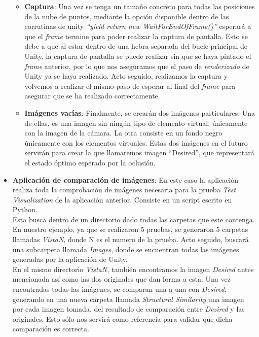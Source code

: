 \begin{itemize}
\begin{itemize}
            \item \textbf{Captura}: Una vez se tenga un tamaño concreto para todas las posiciones de la nube de puntos, mediante la opción disponible dentro de las corrutinas de unity \textit{``yield return new WaitForEndOfFrame()''} esperará a que el \textit{frame} termine para poder realizar la captura de pantalla. Esto se debe a que al estar dentro de una hebra separada del bucle principal de Unity, la captura de pantalla se puede realizar sin que se haya pintado el \textit{frame} anterior, por lo que nos aseguramos que el paso de \textit{renderizado} de Unity ya se haya realizado. Acto seguido, realizamos la captura y volvemos a realizar el mismo paso de esperar al final del \textit{frame} para asegurar que se ha realizado correctamente.
            
            \item \textbf{Imágenes vacías}: Finalmente, se crearán dos imágenes particulares. Una de ellas, es una imagen sin ningún tipo de elemento virtual, únicamente con la imagen de la cámara. La otra consiste en un fondo negro únicamente con los elementos virtuales. Estas dos imágenes en el futuro servirán para crear la que llamaremos imagen ``Desired'', que representará el estado óptimo esperado por la oclusión.
    
    \end{itemize}
    
    \item \textbf{Aplicación de comparación de imágenes}: En este caso la aplicación realiza toda la comprobación de imágenes necesaria para la prueba \textit{Test Visualization} de la aplicación anterior. Consiste en un script escrito en Python.\\
    
    Esta busca dentro de un directorio dado todas las carpetas que este contenga. En nuestro ejemplo, ya que se realizaron 5 pruebas, se generaron 5 carpetas llamadas \textit{VistaN}, donde N es el numero de la prueba. Acto seguido, buscará una subcarpeta llamada \textit{Images}, donde se encuentran todas las imágenes generadas por la aplicación de Unity.\\
    
    En el mismo directorio \textit{VistaN}, también encontramos la imagen \textit{Desired} antes mencionada así como las dos originales que dan forma a esta. Una vez encontradas todas las imágenes, se comparan una a una con \textit{Desired}, generando en una nueva carpeta llamada \textit{Structural Similarity} una imagen por cada imagen tomada, del resultado de comparación entre \textit{Desired} y las originales. Esto sólo nos servirá como referencia para validar que dicha comparación es correcta.\\
    

\end{itemize}
